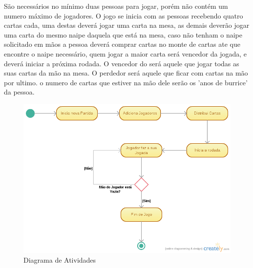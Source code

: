 \documentclass[12pt, a4paper]{article}
\begin{document}
  São necessários no mínimo duas pessoas para jogar, porém não contém um numero máximo de jogadores. O jogo se inicia com as pessoas recebendo quatro cartas cada, uma destas deverá jogar uma carta na mesa, as demais deverão jogar uma carta do mesmo naipe daquela que está na mesa, caso não tenham o naipe solicitado em mãos a pessoa deverá comprar cartas no monte de cartas ate que encontre o naipe necessário, quem jogar a maior carta será  vencedor da jogada, e deverá iniciar a próxima rodada. O vencedor do será aquele que jogar todas as suas cartas da mão na mesa. O perdedor será aquele que ficar com cartas na mão por ultimo. o numero de cartas que estiver na mão dele serão os 'anos de burrice' da pessoa.


  \begin{figure}[!htb]
   \centering
   \includegraphics[scale=0.5]{DiagramaAtividadesBurro}
   \caption{Diagrama de Atividades}
   \label{Rotulo}
  \end{figure}
\end{document}

